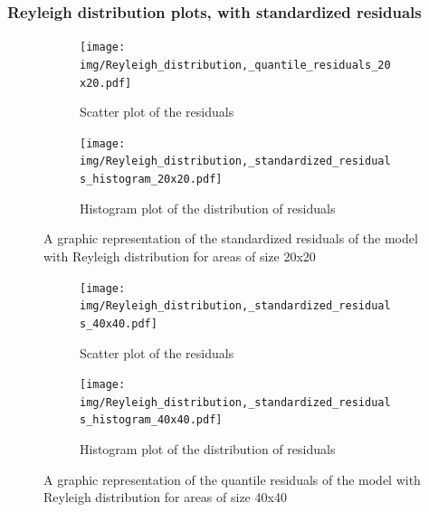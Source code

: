 \documentclass[12pt,a4paper,twoside]{article}
\begin{document}
\newpage

\subsubsection{Reyleigh distribution plots, with standardized residuals}
\label{sssec:reyleighstandardized}
\begin{figure}[!ht]
    \begin{subfigure}{.45\textwidth}
        \centering
        \texttt{[image: img/Reyleigh\_distribution,\_quantile\_residuals\_20x20.pdf]}
        \caption{Scatter plot of the residuals}
        \label{fig:reyleighstandardizedscatter20}
    \end{subfigure}
    \begin{subfigure}{.45\textwidth}
        \centering
        \texttt{[image: img/Reyleigh\_distribution,\_standardized\_residuals\_histogram\_20x20.pdf]}
        \caption{Histogram plot of the distribution of residuals}
        \label{fig:reyleighstandardizedhist20}
    \end{subfigure}
    \caption{A graphic representation of the standardized residuals of the model with Reyleigh
        distribution for areas of size 20x20}
    \label{fig:reyleighstandardizedfig20}
\end{figure}

\begin{figure}[!ht]
    \begin{subfigure}{.45\textwidth}
        \centering
        \texttt{[image: img/Reyleigh\_distribution,\_standardized\_residuals\_40x40.pdf]}
        \caption{Scatter plot of the residuals}
        \label{fig:reyleighstandardizedscatter40}
    \end{subfigure}
    \begin{subfigure}{.45\textwidth}
        \centering
        \texttt{[image: img/Reyleigh\_distribution,\_standardized\_residuals\_histogram\_40x40.pdf]}
        \caption{Histogram plot of the distribution of residuals}
        \label{fig:reyleighstandardizedhist40}
    \end{subfigure}
    \caption{A graphic representation of the quantile residuals of the model with Reyleigh
        distribution for areas of size 40x40}
    \label{fig:reyleighstandardizedfig40}
\end{figure}

\newpage
\end{document}
